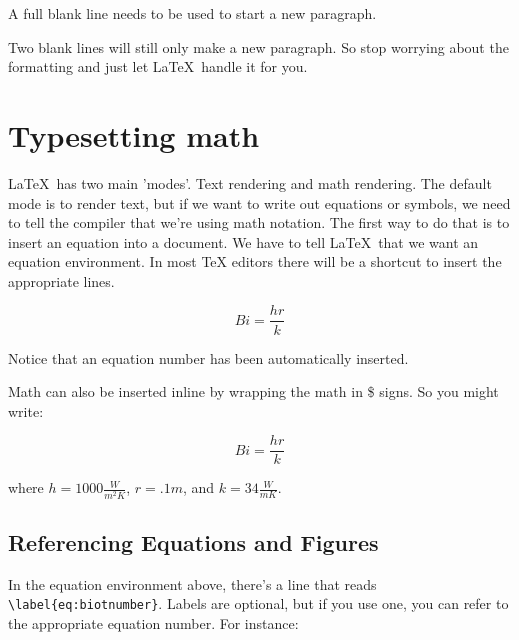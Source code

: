 \documentclass[12pt,a4paper]{article}
\begin{document}
  A full blank line needs to be used to start a new paragraph.  


  Two blank lines will still only make a new paragraph. So stop worrying
  about the formatting and just let \LaTeX\ handle it for you.  

\section{Typesetting math}
  \LaTeX\ has two main 'modes'.  Text
  rendering and math rendering.  The default mode is to render text, but
  if we want to write out equations or symbols, we need to tell the
  compiler that we're using math notation.  The first way to do that is
  to insert an equation into a document.
  We have to tell \LaTeX\ that we want an equation environment.  In most
  TeX editors there will be a shortcut to insert the appropriate
  lines.  

  \begin{equation}
    Bi = \frac{hr}{k}
    \label{eq:biotnumber}
  \end{equation}

  Notice that an equation number has been automatically inserted. 

  Math can also be inserted inline by wrapping the math in \$ signs. So
  you might write: 

  \begin{equation}
    Bi = \frac{hr}{k}
    \label{eq:biotnumber2}
  \end{equation}

  where $h = 1000 \frac{W}{m^2K}$, $r = .1m$, and $k = 34 \frac{W}{m
  K}$.
  
  \subsection{Referencing Equations and Figures}
  In the equation environment above, there's a line that reads
  \verb|\label{eq:biotnumber}|.  Labels are optional, but if you use
  one, you can refer to the appropriate equation number.  For instance:
  
\end{document}
